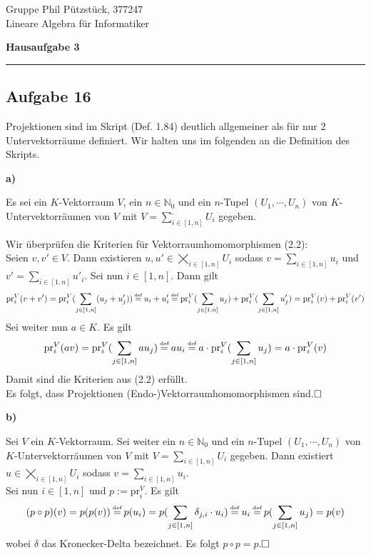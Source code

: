 \documentclass[a4paper,graphics,11pt]{article}
\newcommand{\aufgabe}[1]{\subsection*{Aufgabe #1}}
\newcommand{\up}[2]{\mathrel{\overset{\makebox[0pt]{\mbox{\normalfont\tiny #2}}}{#1}}}
\begin{document}
\noindent Gruppe              \hfill Phil Pützstück, 377247\\
\noindent Lineare Algebra für Informatiker\\
\begin{center}
	\LARGE{\textbf{Hausaufgabe 3}}
\end{center}
\begin{center}
\rule[0.1ex]{\textwidth}{1pt}
\end{center}

\aufgabe{16}
Projektionen sind im Skript (Def. 1.84) deutlich allgemeiner als für nur 2 Untervektorräume definiert.
Wir halten uns im folgenden an die Definition des Skripts.

\textbf{a)}

Es sei ein $K$-Vektorraum $V$, ein $n \in \mathbb{N}_0$ und ein $n$-Tupel $(U_1, \cdots, U_n)$ von
$K$-Untervektorräumen von $V$ mit $\displaystyle V = \sum_{i \in [1,n]}^{\text{.}} U_i$ gegeben.

Wir überprüfen die Kriterien für Vektorraumhomomorphismen (2.2):\\
Seien $v, v' \in V$. Dann existieren $u, u' \in \bigtimes_{i \in [1,n]} U_i$ sodass
$v = \sum_{i \in [1, n]} u_i$ und $v' = \sum_{i \in [1, n]} u'_i$.
Sei nun $i \in [1,n]$. Dann gilt
$$
    \text{pr}_i^V(v + v')
    = \text{pr}_i^V(\sum_{j \in [1,n]} (u_j + u'_j))
    \up{=}{def} u_i + u'_i
    \up{=}{def} \text{pr}_i^V(\sum_{j \in [1,n]} u_j) + \text{pr}_i^V(\sum_{j \in [1,n]} u'_j)
    = \text{pr}_i^V(v) + \text{pr}_i^V(v')
$$
Sei weiter nun $a \in K$. Es gilt
$$
    \text{pr}_i^V(av)
    = \text{pr}_i^V(\sum_{j\in [1,n]} au_j)
    \up{=}{def} au_i
    \up{=}{def} a\cdot \text{pr}_i^V(\sum_{j\in[1,n]} u_j)
    = a\cdot \text{pr}_i^V(v)
$$
Damit sind die Kriterien aus (2.2) erfüllt.\\
Es folgt, dass Projektionen (Endo-)Vektorraumhomomorphismen sind.$\hfill\square$

\textbf{b)}

Sei $V$ ein $K$-Vektorraum. Sei weiter ein $n \in \mathbb{N}_0$ und ein $n$-Tupel $(U_1, \cdots, U_n)$ von $K$-Untervektorräumen von $V$ mit $V = \sum_{i \in [1,n]} U_i$ gegeben.
Dann existiert $u \in \bigtimes_{i \in [1,n]} U_i$ sodass $v = \sum_{i \in [1, n]} u_i$.\\
Sei nun $i \in [1,n]$ und $p := \text{pr}_i^V$. Es gilt
$$
    (p \circ p)(v)
    = p(p(v))
    \up{=}{def} p(u_i)
    = p (\sum_{j \in [1,n]} \delta_{j,i}\cdot u_i)
    \up{=}{def} u_i
    \up{=}{def} p(\sum_{j\in [1,n]} u_j)
    = p(v)
$$
wobei $\delta$ das Kronecker-Delta bezeichnet. Es folgt $p \circ p = p$.$\hfill\square$
\end{document}
